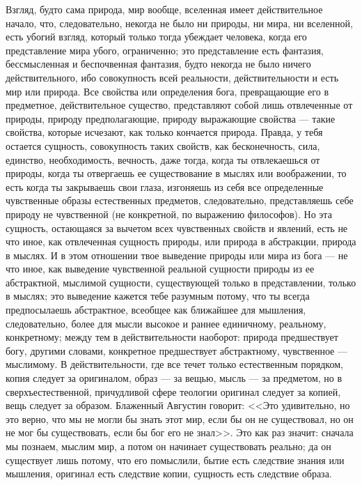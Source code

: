 \documentclass[12pt,oneside]{book}
\begin{document}
Взгляд, будто сама природа, мир вообще, вселенная имеет действительное начало, что, следовательно, некогда не было ни природы, ни мира, ни вселенной, есть убогий взгляд, который только тогда убеждает человека, когда его представление мира убого, ограниченно; это представление есть фантазия, бессмысленная и беспочвенная фантазия, будто некогда не было ничего действительного, ибо совокупность всей реальности, действительности и есть мир или природа. Все свойства или определения бога, превращающие его в предметное, действительное существо, представляют собой лишь отвлеченные от природы, природу предполагающие, природу выражающие свойства --- такие свойства, которые исчезают, как только кончается природа. Правда, у тебя остается сущность, совокупность таких свойств, как бесконечность, сила, единство, необходимость, вечность, даже тогда, когда ты отвлекаешься от природы, когда ты отвергаешь ее существование в мыслях или воображении, то есть когда ты закрываешь свои глаза, изгоняешь из себя все определенные чувственные образы естественных предметов, следовательно, представляешь себе природу не чувственной (не конкретной, по выражению философов). Но эта сущность, остающаяся за вычетом всех чувственных свойств и явлений, есть не что иное, как отвлеченная сущность природы, или природа в абстракции, природа в мыслях. И в этом отношении твое выведение природы или мира из бога --- не что иное, как выведение чувственной реальной сущности природы из ее абстрактной, мыслимой сущности, существующей только в представлении, только в мыслях; это выведение кажется тебе разумным потому, что ты всегда предпосылаешь абстрактное, всеобщее как ближайшее для мышления, следовательно, более для мысли высокое и раннее единичному, реальному, конкретному; между тем в действительности наоборот: природа предшествует богу, другими словами, конкретное предшествует абстрактному, чувственное --- мыслимому. В действительности, где все течет только естественным порядком, копия следует за оригиналом, образ --- за вещью, мысль --- за предметом, но в сверхъестественной, причудливой сфере теологии оригинал следует за копией, вещь следует за образом. Блаженный Августин говорит: <<Это удивительно, но это верно, что мы не могли бы знать этот мир, если бы он не существовал, но он не мог бы существовать, если бы бог его не знал>>. Это как раз значит: сначала мы познаем, мыслим мир, а потом он начинает существовать реально; да он существует лишь потому, что его помыслили, бытие есть следствие знания или мышления, оригинал есть следствие копии, сущность есть следствие образа.
\end{document}

